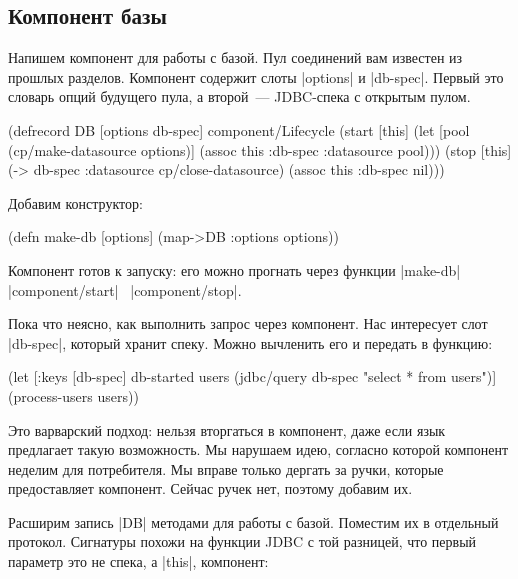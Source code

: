 \subsection{Компонент базы}

Напишем компонент для работы с базой. Пул соединений вам известен из прошлых
разделов. Компонент содержит слоты \spverb|options| и \spverb|db-spec|. Первый
это словарь опций будущего пула, а второй~--- JDBC-спека с открытым пулом.

\begin{english}
  \begin{clojure}
(defrecord DB [options db-spec]
  component/Lifecycle
  (start [this]
    (let [pool (cp/make-datasource options)]
      (assoc this :db-spec {:datasource pool})))
  (stop [this]
    (-> db-spec :datasource cp/close-datasource)
    (assoc this :db-spec nil)))
  \end{clojure}
\end{english}

\noindent
Добавим конструктор:

\begin{english}
  \begin{clojure}
(defn make-db [options]
  (map->DB {:options options}))
  \end{clojure}
\end{english}

Компонент готов к запуску: его можно прогнать через функции
\spverb|make-db|~\arr{} \spverb|component/start|~\arr{} \spverb|component/stop|.

Пока что неясно, как выполнить запрос через компонент. Нас интересует слот
\spverb|db-spec|, который хранит спеку. Можно вычленить его и передать в
функцию:

\begin{english}
  \begin{clojure}
(let [{:keys [db-spec]} db-started
      users (jdbc/query db-spec "select * from users")]
  (process-users users))
  \end{clojure}
\end{english}

Это варварский подход: нельзя вторгаться в компонент, даже если язык предлагает
такую возможность. Мы нарушаем идею, согласно которой компонент неделим для
потребителя. Мы вправе только дергать за ручки, которые предоставляет
компонент. Сейчас ручек нет, поэтому добавим их.

Расширим запись \spverb|DB| методами для работы с базой. Поместим их в отдельный
протокол. Сигнатуры похожи на функции JDBC с той разницей, что первый параметр
это не спека, а \spverb|this|, компонент:


